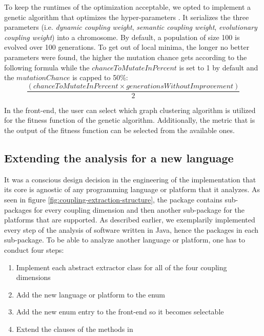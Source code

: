 \documentclass[12pt,a4paper]{report}
\begin{document}
To keep the runtimes of the optimization acceptable, we opted to implement a
genetic algorithm that optimizes the hyper\hyp parameters \cite{eiben2003introduction}.
It serializes the three parameters (i.e. \textit{dynamic coupling weight},
\textit{semantic coupling weight}, \textit{evolutionary coupling weight}) into
a chromosome. By default, a population of size 100 is evolved over 100 generations.
To get out of local minima, the longer no better parameters were found, the higher
the mutation chance gets according to the following formula while the
$chanceToMutateInPercent$ is set to 1 by default and the $mutationChance$
is capped to 50\%:
\[
  \frac{(chanceToMutateInPercent \times generationsWithoutImprovement)}{2}
\]

In the front\hyp end, the user can select which graph clustering algorithm is
utilized for the fitness function of the genetic algorithm.
Additionally, the metric that is the output of the fitness function can be
selected from the available ones.


\subsection{Extending the analysis for a new language}

It was a conscious design decision in the engineering of the implementation that its core
is agnostic of any programming language or platform that it analyzes.
As seen in figure \ref{fig:coupling-extraction-structure}, the 
package contains sub\hyp packages for every coupling dimension and then another sub\hyp package
for the platforms that are supported. As described earlier, we exemplarily implemented every step
of the analysis of software written in Java, hence the  packages in each
 sub\hyp package.
To be able to analyze another language or platform, one has to conduct four steps:
\begin{enumerate}
    \item Implement each abstract extractor class for all of the four coupling dimensions
    \item Add the new language or platform to the  enum
    \item Add the new enum entry to the front-end so it becomes selectable
    \item Extend the clauses of the methods in 
\end{enumerate}
\end{document}
